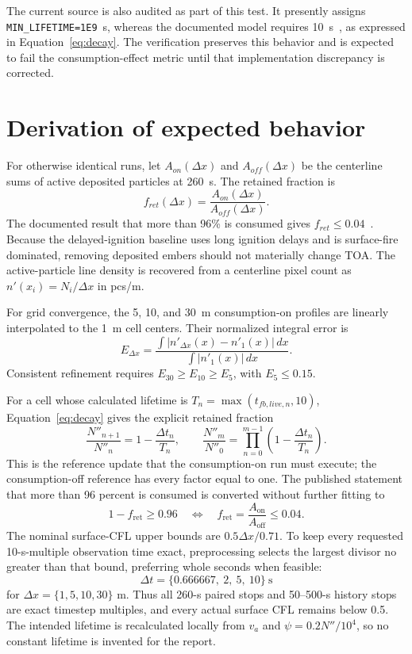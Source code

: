 The current source is also audited as part of this test. It presently assigns
\texttt{MIN\_LIFETIME=1E9}~s, whereas the documented model requires
\SI{10}{s}~\cite{Qin2025}, as expressed in Equation~\ref{eq:decay}. The
verification preserves this behavior
and is expected to fail the consumption-effect metric until that implementation
discrepancy is corrected.

\section{Derivation of expected behavior}
For otherwise identical runs, let \(A_{on}(\Delta x)\) and
\(A_{off}(\Delta x)\) be the centerline sums of active deposited particles at
260~s. The retained fraction is
\begin{equation}
 f_{ret}(\Delta x)=\frac{A_{on}(\Delta x)}{A_{off}(\Delta x)}.
\end{equation}
The documented result that more than 96\% is consumed gives
\(f_{ret}\le0.04\)~\cite{Qin2025}. Because the delayed-ignition baseline uses
long ignition delays and is surface-fire dominated, removing deposited embers
should not materially change TOA. The active-particle line density is recovered from a
centerline pixel count as \(n'(x_i)=N_i/\Delta x\) in pcs/m.

For grid convergence, the 5, 10, and 30~m consumption-on profiles are linearly
interpolated to the 1~m cell centers. Their normalized integral error is
\begin{equation}
 E_{\Delta x}=\frac{\int|n'_{\Delta x}(x)-n'_1(x)|\,dx}
                         {\int|n'_1(x)|\,dx}.
\end{equation}
Consistent refinement requires \(E_{30}\ge E_{10}\ge E_5\), with
\(E_5\le0.15\).

For a cell whose calculated lifetime is \(T_n=\max(t_{fb,live,n},10)\),
Equation~\ref{eq:decay} gives the explicit retained fraction
\[
 \frac{N''_{n+1}}{N''_n}=1-\frac{\Delta t_n}{T_n},\qquad
 \frac{N''_m}{N''_0}=\prod_{n=0}^{m-1}
 \left(1-\frac{\Delta t_n}{T_n}\right).
\]
This is the reference update that the consumption-on run must execute; the
consumption-off reference has every factor equal to one.  The published
statement that more than 96 percent is consumed is converted without further
fitting to
\[
 1-f_{\mathrm{ret}}\geq0.96
 \quad\Longleftrightarrow\quad
 f_{\mathrm{ret}}=\frac{A_{\mathrm{on}}}{A_{\mathrm{off}}}\leq0.04.
\]
The nominal surface-CFL upper bounds are \(0.5\Delta x/0.71\). To keep every requested 10-s-multiple observation time exact, preprocessing selects the largest divisor no greater than that bound, preferring whole seconds when feasible:
\[
 \Delta t=\{0.666667,\ 2,\ 5,\ 10\}~\mathrm{s}
\]
for \(\Delta x=\{1,5,10,30\}\) m. Thus all 260-s paired stops and 50--500-s history stops are exact timestep multiples, and every actual surface CFL remains below 0.5. The intended lifetime is recalculated
locally from \(v_a\) and
\(\psi=0.2N''/10^4\), so no constant lifetime is invented for the report.


